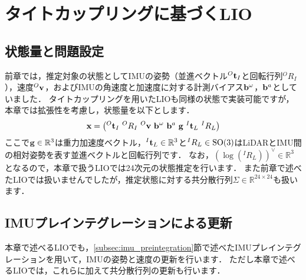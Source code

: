 \chapter{タイトカップリングに基づくLIO}

\section{状態量と問題設定}

前章では，推定対象の状態としてIMUの姿勢（並進ベクトル${}^{O}{\bf t}_{I}$と回転行列${}^{O}R_{I}$），速度${}^{O}{\bf v}$，およびIMUの角速度と加速度に対する計測バイアス${\bf b}^{\omega}$，${\bf b}^{a}$としていました．
タイトカップリングを用いたLIOも同様の状態で実装可能ですが，本章では拡張性を考慮し，状態量を以下とします．
%
\begin{align}
  {\bf x} = \left( {}^{O}{\bf t}_{I} ~ {}^{O}R_{I} ~ {}^{O}{\bf v} ~ {\bf b}^{\omega} ~ {\bf b}^{a} ~ {\bf g} ~ {}^{I}{\bf t}_{L} ~ {}^{I}R_{L} \right)
  \label{eq:tight_coupling_lio_state}
\end{align}
%
ここで${\bf g} \in \mathbb{R}^{3}$は重力加速度ベクトル，${}^{I}{\bf t}_{L} \in \mathbb{R}^{3}$と${}^{I}R_{L} \in {\rm SO}(3)$はLiDARとIMU間の相対姿勢を表す並進ベクトルと回転行列です．
なお，$\left( \log \left( {}^{I}R_{L} \right) \right)^{\vee} \in \mathbb{R}^{3}$となるので，本章で扱うLIOでは24次元の状態推定を行います．
また前章で述べたLIOでは扱いませんでしたが，推定状態に対する共分散行列$\Sigma \in \mathbb{R}^{24 \times 24}$も扱います．













\section{IMUプレインテグレーションによる更新}

本章で述べるLIOでも，\ref{subsec:imu_preintegration}節で述べたIMUプレインテグレーションを用いて，IMUの姿勢と速度の更新を行います．
ただし本章で述べるLIOでは，これらに加えて共分散行列の更新も行います．


